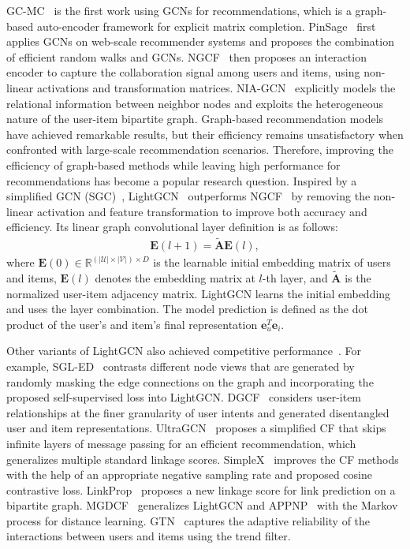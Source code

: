 \documentclass[sigconf,natbib=true]{acmart}
\begin{document}
GC-MC~\cite{Rianne2017GCMC} is the first work using GCNs for recommendations, which is a graph-based auto-encoder framework for explicit matrix completion. PinSage~\cite{Rex2018pinsage} first applies GCNs on web-scale recommender systems and proposes the combination of efficient random walks and GCNs. NGCF~\cite{Wang19NGCF} then proposes an interaction encoder to capture the collaboration signal among users and items, using non-linear activations and transformation matrices. NIA-GCN~\cite{sun2020NIA-GCN} explicitly models the relational information between neighbor nodes and exploits the heterogeneous nature of the user-item bipartite graph.
Graph-based recommendation models have achieved remarkable results, but their efficiency remains unsatisfactory when confronted with large-scale recommendation scenarios. Therefore, improving the efficiency of graph-based methods while leaving high performance for recommendations has become a popular research question. Inspired by a simplified GCN (SGC)~\cite{Wu2019SGC}, LightGCN~\cite{He20LightGCN} outperforms NGCF~\cite{Wang19NGCF} by removing the non-linear activation and feature transformation to improve both accuracy and efficiency. Its linear graph convolutional layer definition is as follows:
\begin{align}\label{eq:lgc}
\mathbf{E}(l+1)=\tilde{\mathbf{A}}\mathbf{E}(l),
\end{align} where $\mathbf{E}(0)\in \mathbb{R}^{(|\mathcal{U}| \times |\mathcal{V}|)\times D}$ is the learnable initial embedding matrix of users and items, $\mathbf{E}(l)$ denotes the embedding matrix at $l$-th layer, and $\tilde{\mathbf{A}}$ is the normalized user-item adjacency matrix. LightGCN learns the initial embedding and uses the layer combination. The model prediction is defined as the dot product of the user’s and item’s final representation $\bm{e}_u^T\bm{e}_i$. 

Other variants of LightGCN also achieved competitive performance~\cite{Xiang2020DGCF19,Mao21UltraGCN,Wu2021SGLED,mao2021simplex,fu2022revisiting,lee2021BUIR,hu2022mgdcf}. For example, SGL-ED~\cite{Wu2021SGLED} contrasts different node views that are generated by randomly masking the edge connections on the graph and incorporating the proposed self-supervised loss into LightGCN. DGCF~\cite{Xiang2020DGCF19} considers user-item relationships at the finer granularity of user intents and generated disentangled user and item representations. UltraGCN~\cite{Mao21UltraGCN} proposes a simplified CF that skips infinite layers of message passing for an efficient recommendation, which generalizes multiple standard linkage scores. SimpleX~\cite{mao2021simplex} improves the CF methods with the help of an appropriate negative sampling rate and proposed cosine contrastive loss. LinkProp~\cite{fu2022revisiting} proposes a new linkage score for link prediction on a bipartite graph. MGDCF~\cite{hu2022mgdcf} generalizes LightGCN and APPNP~\cite{Klicpera2019APPNP} with the Markov process for distance learning. GTN~\cite{fan2022GTN} captures the adaptive reliability of the interactions between users and items using the trend filter.
\end{document}
